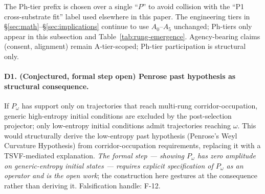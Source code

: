 \documentclass[11pt,a4paper]{article}
\begin{document}
The Ph-tier prefix is chosen over a single ``$P$'' to avoid collision with the ``P1 cross-substrate fit'' label used elsewhere in this paper. The engineering tiers in \S\ref{sec:math}--\S\ref{sec:implications} continue to use $A_0$--$A_5$ unchanged; Ph-tiers only appear in this subsection and Table~\ref{tab:rung-emergence}. Agency-bearing claims (consent, alignment) remain A-tier-scoped; Ph-tier participation is structural only.

\paragraph{D1. (Conjectured, formal step open) Penrose past hypothesis as structural consequence.} If $P_\omega$ has support only on trajectories that reach multi-rung corridor-occupation, generic high-entropy initial conditions are excluded by the post-selection projector; only low-entropy initial conditions admit trajectories reaching $\omega$. This would structurally derive the low-entropy past hypothesis (Penrose's Weyl Curvature Hypothesis) from corridor-occupation requirements, replacing it with a TSVF-mediated explanation. \emph{The formal step --- showing $P_\omega$ has zero amplitude on generic-entropy initial states --- requires explicit specification of $P_\omega$ as an operator and is the open work}; the construction here gestures at the consequence rather than deriving it. Falsification handle: F-12.
\end{document}
